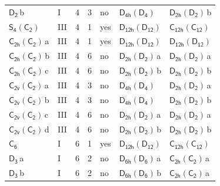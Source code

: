 \documentclass[10pt,a4paper]{article}
\numberwithin{equation}{section}
\newcommand{\grp}[1]{\mathsf{#1}}
\newcommand{\clsletter}[1]{\,{\scriptsize\color{black!55}#1}}
\begin{document}
{\begin{longtable}{@{}llrrlll@{}}
\href{../../../rotation/data/pdf/D2.pdf}{$\grp{D_{2}}$}\clsletter{b} & I & 4 & 3 & no & \href{D4h-D4.pdf}{$\grp{D_{4h}}(\grp{D_{4}})$} & \href{D2h-D2.pdf}{$\grp{D_{2h}}(\grp{D_{2}})$}\clsletter{b}\\
\href{S4-C2.pdf}{$\grp{S_{4}}(\grp{C_{2}})$} & III & 4 & 1 & yes & \href{D12h-D12.pdf}{$\grp{D_{12h}}(\grp{D_{12}})$} & \href{C12h-C12.pdf}{$\grp{C_{12h}}(\grp{C_{12}})$}\\
\href{C2h-C2.pdf}{$\grp{C_{2h}}(\grp{C_{2}})$}\clsletter{a} & III & 4 & 1 & yes & \href{D12h-D12.pdf}{$\grp{D_{12h}}(\grp{D_{12}})$} & \href{D12h-D12.pdf}{$\grp{D_{12h}}(\grp{D_{12}})$}\\
\href{C2h-C2.pdf}{$\grp{C_{2h}}(\grp{C_{2}})$}\clsletter{b} & III & 4 & 6 & no & \href{D2h-D2.pdf}{$\grp{D_{2h}}(\grp{D_{2}})$}\clsletter{a} & \href{D2h-D2.pdf}{$\grp{D_{2h}}(\grp{D_{2}})$}\clsletter{a}\\
\href{C2h-C2.pdf}{$\grp{C_{2h}}(\grp{C_{2}})$}\clsletter{c} & III & 4 & 6 & no & \href{D2h-D2.pdf}{$\grp{D_{2h}}(\grp{D_{2}})$}\clsletter{b} & \href{D2h-D2.pdf}{$\grp{D_{2h}}(\grp{D_{2}})$}\clsletter{b}\\
\href{C2v-C2.pdf}{$\grp{C_{2v}}(\grp{C_{2}})$}\clsletter{a} & III & 4 & 3 & no & \href{D4h-D4.pdf}{$\grp{D_{4h}}(\grp{D_{4}})$} & \href{D2h-D2.pdf}{$\grp{D_{2h}}(\grp{D_{2}})$}\clsletter{a}\\
\href{C2v-C2.pdf}{$\grp{C_{2v}}(\grp{C_{2}})$}\clsletter{b} & III & 4 & 3 & no & \href{D4h-D4.pdf}{$\grp{D_{4h}}(\grp{D_{4}})$} & \href{D2h-D2.pdf}{$\grp{D_{2h}}(\grp{D_{2}})$}\clsletter{b}\\
\href{C2v-C2.pdf}{$\grp{C_{2v}}(\grp{C_{2}})$}\clsletter{c} & III & 4 & 6 & no & \href{D2h-D2.pdf}{$\grp{D_{2h}}(\grp{D_{2}})$}\clsletter{a} & \href{D2h-D2.pdf}{$\grp{D_{2h}}(\grp{D_{2}})$}\clsletter{a}\\
\href{C2v-C2.pdf}{$\grp{C_{2v}}(\grp{C_{2}})$}\clsletter{d} & III & 4 & 6 & no & \href{D2h-D2.pdf}{$\grp{D_{2h}}(\grp{D_{2}})$}\clsletter{b} & \href{D2h-D2.pdf}{$\grp{D_{2h}}(\grp{D_{2}})$}\clsletter{b}\\
\href{../../../rotation/data/pdf/C6.pdf}{$\grp{C_{6}}$} & I & 6 & 1 & yes & \href{D12h-D12.pdf}{$\grp{D_{12h}}(\grp{D_{12}})$} & \href{C12h-C12.pdf}{$\grp{C_{12h}}(\grp{C_{12}})$}\\
\href{../../../rotation/data/pdf/D3.pdf}{$\grp{D_{3}}$}\clsletter{a} & I & 6 & 2 & no & \href{D6h-D6.pdf}{$\grp{D_{6h}}(\grp{D_{6}})$}\clsletter{a} & \href{C2h-C2.pdf}{$\grp{C_{2h}}(\grp{C_{2}})$}\clsletter{a}\\
\href{../../../rotation/data/pdf/D3.pdf}{$\grp{D_{3}}$}\clsletter{b} & I & 6 & 2 & no & \href{D6h-D6.pdf}{$\grp{D_{6h}}(\grp{D_{6}})$}\clsletter{b} & \href{C2h-C2.pdf}{$\grp{C_{2h}}(\grp{C_{2}})$}\clsletter{a}\\

\end{longtable}}
\end{document}
